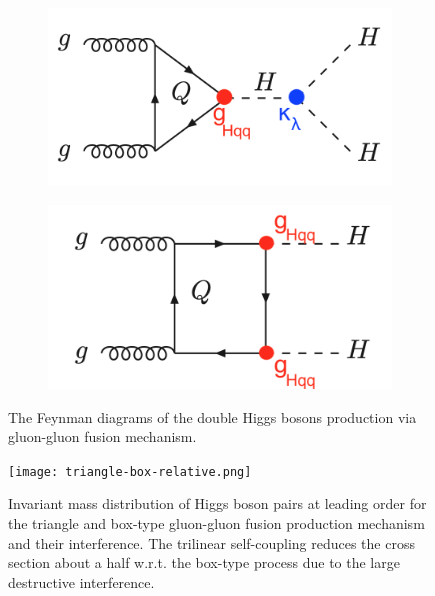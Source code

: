 \begin{figure}[ht]
        \centering
        \begin{subfigure}[b]{0.475\textwidth}
            \centering
            \includegraphics[width=\textwidth]{MSc_Thesis/fig/ggF1.png}
            \vspace{-0.5cm}
        \end{subfigure}
        \hspace{0.2cm}
        \begin{subfigure}[b]{0.475\textwidth}  
            \centering 
            \includegraphics[width=\textwidth]{MSc_Thesis/fig/ggF2.png}
            \vspace{-0.5cm}
        \end{subfigure}
        \caption[]
        {\small The Feynman diagrams of the double Higgs bosons production via gluon-gluon fusion mechanism.}
        \label{ggF-HH}
\end{figure}

\begin{figure}[ht]
	\centering
	\texttt{[image: triangle-box-relative.png]}
	\caption[Invariant mass distribution of Higgs boson pairs at leading order for the triangle and box-type gluon-gluon fusion production mechanism and their interference.]{Invariant mass distribution of Higgs boson pairs at leading order for the triangle and box-type gluon-gluon fusion production mechanism and their interference. The trilinear self-coupling reduces the cross section about a half w.r.t. the box-type process due to the large destructive interference\cite{DiMicco:2690841}.}
	\label{triangle-box-relative}
\end{figure}

